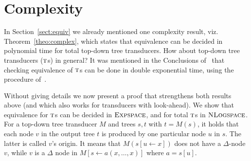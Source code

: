 \documentclass[copyright,creativecommons]{eptcs}
\newcommand{\ttt}{\textsc{t}}
\newcommand{\expspace}{\textsc{Expspace}}
\newcommand{\nlogspace}{\textsc{NLogspace}}
\begin{document}
\section{Complexity}

In Section~\ref{sect:equiv} we already mentioned one
complexity result, viz. Theorem~\ref{theo:complex}, which states 
that equivalence can be decided in
polynomial time for total  top-down tree transducers.
How about top-down tree transducers ($\ttt$s) in general?
It was mentioned in the Conclusions of~\cite{DBLP:conf/mfcs/BenediktEM13}
that checking equivalence of $\ttt$s can be done in double exponential time,
using the procedure of~\cite{DBLP:journals/jcss/EngelfrietMS09}.

Without giving details we now present a proof that strengthens
both results above (and which also works for transducers with look-ahead).
We show that equivalence for $\ttt$s can be decided in $\expspace$,
and for total $\ttt$s in $\nlogspace$.
For a top-down tree transducer $M$ and trees $s,t$ with $t=M(s)$,
it holds that each node $v$ in the output tree $t$ is produced by one
particular node $u$ in $s$. The latter is called $v$'s origin. 
It means that $M(s[u\leftarrow x])$ does not have a $\Delta$-node $v$,
while $v$ is a $\Delta$ node in $M[s\leftarrow a(x,\dots,x)]$ where $a=s[u]$.
\end{document}
